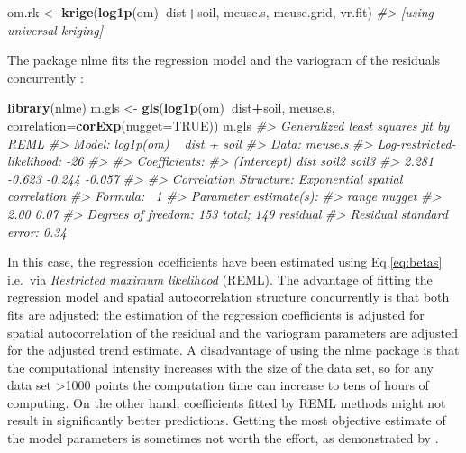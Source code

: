\documentclass[11pt]{krantz}
\newenvironment{Shaded}{\begin{snugshade}}{\end{snugshade}}
\newcommand{\CommentTok}[1]{\textcolor[rgb]{0.37,0.37,0.37}{\textit{#1}}}
\newcommand{\DataTypeTok}[1]{\textcolor[rgb]{0.27,0.27,0.27}{#1}}
\newcommand{\KeywordTok}[1]{\textcolor[rgb]{0.27,0.27,0.27}{\textbf{#1}}}
\newcommand{\NormalTok}[1]{#1}
\newcommand{\OperatorTok}[1]{\textcolor[rgb]{0.43,0.43,0.43}{\textbf{#1}}}
\newcommand{\OtherTok}[1]{\textcolor[rgb]{0.37,0.37,0.37}{#1}}
\newcommand{\StringTok}[1]{\textcolor[rgb]{0.5,0.5,0.5}{#1}}
\theoremstyle{definition}
\theoremstyle{definition}
\theoremstyle{definition}
\theoremstyle{remark}
\begin{document}
\begin{Shaded}
\begin{Highlighting}[]
\NormalTok{om.rk <-}\StringTok{ }\KeywordTok{krige}\NormalTok{(}\KeywordTok{log1p}\NormalTok{(om)}\OperatorTok{~}\NormalTok{dist}\OperatorTok{+}\NormalTok{soil, meuse.s, meuse.grid, vr.fit)}
\CommentTok{#> [using universal kriging]}
\end{Highlighting}
\end{Shaded}

The package nlme fits the regression model and the variogram of the
residuals concurrently \citep{pinheiro2009mixed}:

\begin{Shaded}
\begin{Highlighting}[]
\KeywordTok{library}\NormalTok{(nlme)}
\NormalTok{m.gls <-}\StringTok{ }\KeywordTok{gls}\NormalTok{(}\KeywordTok{log1p}\NormalTok{(om)}\OperatorTok{~}\NormalTok{dist}\OperatorTok{+}\NormalTok{soil, meuse.s, }\DataTypeTok{correlation=}\KeywordTok{corExp}\NormalTok{(}\DataTypeTok{nugget=}\OtherTok{TRUE}\NormalTok{))}
\NormalTok{m.gls}
\CommentTok{#> Generalized least squares fit by REML}
\CommentTok{#>   Model: log1p(om) ~ dist + soil }
\CommentTok{#>   Data: meuse.s }
\CommentTok{#>   Log-restricted-likelihood: -26}
\CommentTok{#> }
\CommentTok{#> Coefficients:}
\CommentTok{#> (Intercept)        dist       soil2       soil3 }
\CommentTok{#>       2.281      -0.623      -0.244      -0.057 }
\CommentTok{#> }
\CommentTok{#> Correlation Structure: Exponential spatial correlation}
\CommentTok{#>  Formula: ~1 }
\CommentTok{#>  Parameter estimate(s):}
\CommentTok{#>  range nugget }
\CommentTok{#>   2.00   0.07 }
\CommentTok{#> Degrees of freedom: 153 total; 149 residual}
\CommentTok{#> Residual standard error: 0.34}
\end{Highlighting}
\end{Shaded}

In this case, the regression coefficients have been estimated using
Eq.\eqref{eq:betas} i.e.~via \emph{Restricted maximum likelihood} (REML).
The advantage of fitting the regression model and spatial
autocorrelation structure concurrently is that both fits are adjusted:
the estimation of the regression coefficients is adjusted for spatial
autocorrelation of the residual and the variogram parameters are
adjusted for the adjusted trend estimate. A disadvantage of using the
nlme package is that the computational intensity increases with the size
of the data set, so for any data set \textgreater{}1000 points the
computation time can increase to tens of hours of computing. On the
other hand, coefficients fitted by REML methods might not result in
significantly better predictions. Getting the most objective estimate of
the model parameters is sometimes not worth the effort, as demonstrated
by \citet{Minasny2007Geoderma}.
\end{document}
